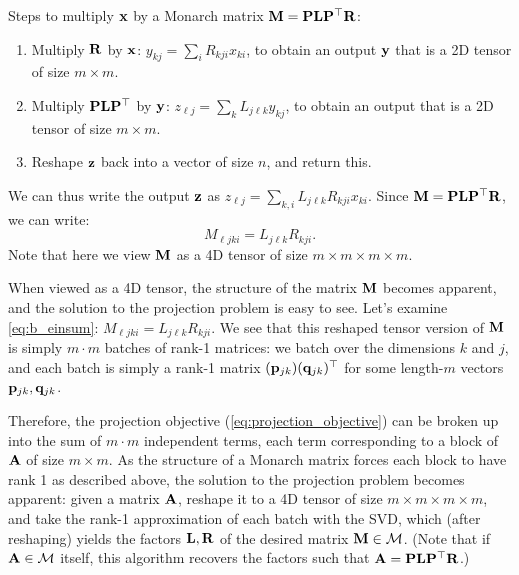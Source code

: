 Steps to multiply $\mathbf{x}$ by a Monarch matrix $\mathbf{M} = \mathbf{P} \mathbf{L} \mathbf{P}^\top \mathbf{R}$:
\begin{enumerate}[leftmargin=*,nosep,nolistsep,noitemsep]
  \item Multiply $\mathbf{R}$ by $\mathbf{x}$: $y_{kj} = \sum_i R_{kji} x_{ki}$, to obtain an output $\mathbf{y}$ that is a
  2D tensor of size $m \times m$.
  \item Multiply $\mathbf{P} \mathbf{L} \mathbf{P}^\top$ by $\mathbf{y}$: $z_{\ell j} = \sum_k L_{j\ell k} y_{kj}$, to obtain an output
  that is a 2D tensor of size $m \times m$.
  \item Reshape $\mathbf{z}$ back into a vector of size $n$, and return this.
\end{enumerate}
We can thus write the output $\mathbf{z}$ as $z_{\ell j} = \sum_{k, i} L_{j\ell k} R_{kji} x_{ki}$.
\newline Since $\mathbf{M} = \mathbf{P} \mathbf{L} \mathbf{P}^\top\mathbf{R}$, we can write:
\begin{equation}
  \label{eq:b_einsum}
  M_{\ell jki} = L_{j\ell k} R_{kji}.
\end{equation}
Note that here we view $\mathbf{M}$ as a 4D tensor of size
$m \times m \times m \times m$.

When viewed as a 4D tensor, the structure of the matrix $\mathbf{M}$ becomes
apparent, and the solution to the projection problem is easy to see.
Let's examine \cref{eq:b_einsum}: $M_{\ell jki} = L_{j\ell k} R_{kji}$.
We see that this reshaped tensor version of $\mathbf{M}$ is simply $m \cdot m$ batches of
rank-1 matrices: we batch over the dimensions $k$ and $j$, and each batch is
simply a rank-1 matrix $(\mathbf{p}_{jk}) (\mathbf{q}_{jk})^\top$ for some length-$m$ vectors $\mathbf{p}_{jk}, \mathbf{q}_{jk}$.

Therefore, the projection objective (\cref{eq:projection_objective}) can be broken up
into the sum of $m \cdot m$ independent terms, each term corresponding to a
block of $\mathbf{A}$ of size $m \times m$.
As the structure of a Monarch matrix forces each
block to have rank 1 as described above,
the solution to the projection problem becomes apparent:
given a matrix $\mathbf{A}$, reshape it to a 4D tensor of size
$m \times m \times m \times m$, and take the rank-1
approximation of each batch with the SVD, which (after reshaping)
yields the factors $\mathbf{L}, \mathbf{R}$ of the desired matrix $\mathbf{M} \in \mathcal{M}$.
(Note that if $\mathbf{A} \in \mathcal{M}$ itself, this algorithm recovers the factors such that $\mathbf{A} = \mathbf{P} \mathbf{L} \mathbf{P}^\top\mathbf{R}$.)


